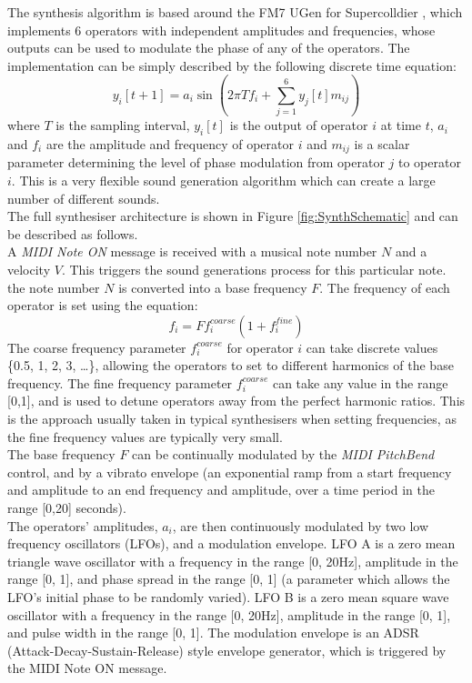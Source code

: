 \documentclass[11pt, oneside]{report}   	%
\begin{document}
The synthesis algorithm is based around the FM7 UGen for Supercolldier \cite{UGen}, which implements 6 operators with independent amplitudes and frequencies, whose outputs can be used to modulate the phase of any of the operators. The implementation can be simply described by the following discrete time equation: 
\begin{equation}
y_i[t+1] = a_i\sin(2\pi T f_i + \sum_{j = 1}^{6} y_j[t] m_{ij})
\end{equation}
where $T$ is the sampling interval,  $y_i[t]$ is the output of operator $i$ at time $t$, $a_i$ and $f_i$ are the amplitude and frequency of operator $i$ and $m_{ij}$ is a scalar parameter determining the level of phase modulation from operator $j$ to operator $i$. This is a very flexible sound generation algorithm which can create a large number of different sounds. \\
The full synthesiser architecture is shown in Figure \ref{fig:SynthSchematic} and can be described as follows.\\
 A \emph{MIDI Note ON} message is received with a musical note number $N$ and a velocity $V$. This triggers the sound generations process for this particular note. the note number $N$ is converted into a base frequency $F$. The frequency of each operator is set using the equation: 
 \begin{equation}
	f_i = Ff_i^{coarse}(1+f_i^{fine})
 \end{equation}
The coarse frequency parameter $f_i^{coarse}$ for operator $i$ can take discrete values \{0.5, 1, 2, 3, \dots\}, allowing the operators to set to different harmonics of the base frequency. The fine frequency parameter $f_i^{coarse}$ can take any value in the range [0,1], and is used to detune operators away from the perfect harmonic ratios. This is the approach usually taken in typical synthesisers when setting frequencies, as the fine frequency values are typically very small.\\
The base frequency $F$ can be continually modulated by the \emph{MIDI PitchBend} control, and by a vibrato envelope (an exponential ramp from a start frequency and amplitude to an end frequency and amplitude, over a time period in the range [0,20] seconds).\\
The operators' amplitudes, $a_i$, are then continuously modulated by two low frequency oscillators (LFOs), and a modulation envelope. LFO A is a zero mean triangle wave oscillator with a frequency in the range [0, 20\si{\hertz}], amplitude in the range [0, 1], and phase spread in the range [0, 1] (a parameter which allows the LFO's initial phase to be randomly varied). LFO B is a zero mean square wave oscillator with a frequency in the range [0, 20\si{\hertz}], amplitude in the range [0, 1], and pulse width in the range [0, 1]. The modulation envelope is an ADSR (Attack-Decay-Sustain-Release) style envelope generator, which is triggered by the MIDI Note ON message.
\end{document}
